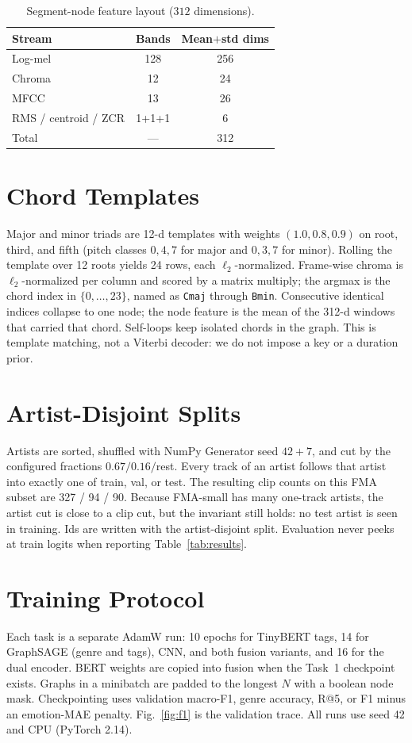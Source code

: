 \documentclass[conference]{IEEEtran}
\begin{document}
\begin{table}[t]
\caption{Segment-node feature layout ($312$ dimensions).}
\label{tab:nodedim}
\centering
\scriptsize
\begin{tabular}{lcc}
\toprule
Stream & Bands & Mean$+$std dims \\
\midrule
Log-mel & 128 & 256 \\
Chroma & 12 & 24 \\
MFCC & 13 & 26 \\
RMS / centroid / ZCR & 1+1+1 & 6 \\
Total & --- & 312 \\
\bottomrule
\end{tabular}
\end{table}

\section{Chord Templates}
Major and minor triads are 12-d templates with weights $(1.0,0.8,0.9)$ on root, third, and fifth (pitch classes $0,4,7$ for major and $0,3,7$ for minor). Rolling the template over 12 roots yields 24 rows, each $\ell_2$-normalized. Frame-wise chroma is $\ell_2$-normalized per column and scored by a matrix multiply; the argmax is the chord index in $\{0,\ldots,23\}$, named as \texttt{Cmaj} through \texttt{Bmin}. Consecutive identical indices collapse to one node; the node feature is the mean of the 312-d windows that carried that chord. Self-loops keep isolated chords in the graph. This is template matching, not a Viterbi decoder: we do not impose a key or a duration prior.

\section{Artist-Disjoint Splits}
Artists are sorted, shuffled with NumPy Generator seed $42+7$, and cut by the configured fractions $0.67/0.16/$rest. Every track of an artist follows that artist into exactly one of train, val, or test. The resulting clip counts on this FMA subset are 327 / 94 / 90. Because FMA-small has many one-track artists, the artist cut is close to a clip cut, but the invariant still holds: no test artist is seen in training. Ids are written with the artist-disjoint split. Evaluation never peeks at train logits when reporting Table~\ref{tab:results}.

\section{Training Protocol}
Each task is a separate AdamW run: 10 epochs for TinyBERT tags, 14 for GraphSAGE (genre and tags), CNN, and both fusion variants, and 16 for the dual encoder. BERT weights are copied into fusion when the Task~1 checkpoint exists. Graphs in a minibatch are padded to the longest $N$ with a boolean node mask. Checkpointing uses validation macro-F1, genre accuracy, R@5, or F1 minus an emotion-MAE penalty. Fig.~\ref{fig:f1} is the validation trace. All runs use seed 42 and CPU (PyTorch 2.14).
\end{document}
